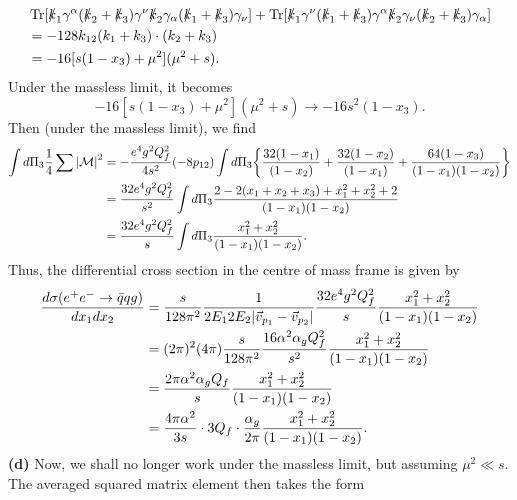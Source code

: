\documentclass[11pt]{article}
\theoremstyle{definition}
\begin{document}
\begin{equation}
    \begin{aligned}
        &\Tr[\slashed{k}_1\gamma^\alpha(\slashed{k}_2 + \slashed{k}_3)\gamma^\nu\slashed{k}_2\gamma_\alpha(\slashed{k}_1 + \slashed{k}_3)\gamma_\nu]+ \Tr[\slashed{k}_1\gamma^\nu(\slashed{k}_1 + \slashed{k}_3)\gamma^\alpha\slashed{k}_2\gamma_\nu(\slashed{k}_2 + \slashed{k}_3)\gamma_\alpha] \\
        &= -128k_{12}(k_1+k_3)\cdot(k_2+k_3)\\
        &= -16[s(1-x_3)+\mu^2](\mu^2+s).
    \end{aligned}
\end{equation}
Under the massless limit, it becomes
\begin{equation}
    -16[s(1-x_3)+\mu^2](\mu^2+s) \to -16s^2(1-x_3).
\end{equation}
Then (under the massless limit), we find
\begin{equation}
    \begin{aligned}
        \int d\Pi_3 \frac{1}{4}\sum \abs{\mathcal{M}}^2 
        &= -\frac{e^4g^2Q_f^2}{4s^2}(-8p_{12})\int d\Pi_3\bigg\{\frac{32(1-x_1)}{(1-x_2)} + \frac{32(1-x_2)}{(1-x_1)} + \frac{64(1-x_3)}{(1-x_1)(1-x_2)}\bigg\}\\
        &=\frac{32e^4g^2Q_f^2}{s^2}\int d\Pi_3\frac{2-2(x_1+x_2+x_3)+x_1^2+x_2^2+2}{(1-x_1)(1-x_2)}\\
        &=\frac{32e^4g^2Q_f^2}{s}\int d\Pi_3\frac{x_1^2 + x_2^2}{(1-x_1)(1-x_2)}.
    \end{aligned}
\end{equation}
Thus, the differential cross section in the centre of mass frame is given by
\begin{equation}
    \begin{aligned}
        \frac{d\sigma(e^+e^-\to\bar{q}qg)}{dx_1dx_2} &= \frac{s}{128\pi^2}\frac{1}{2E_12E_2\abs{\vec{v}_{p_1}-\vec{v}_{p_2}}}\frac{32e^4g^2Q_f^2}{s}\frac{x_1^2 + x_2^2}{(1-x_1)(1-x_2)}\\
        &= (2\pi)^2(4\pi)\frac{s}{128\pi^2}\frac{16\alpha^2\alpha_gQ_f^2}{s^2}\frac{x_1^2 + x_2^2}{(1-x_1)(1-x_2)}\\
        &= \frac{2\pi\alpha^2\alpha_gQ_f}{s}\frac{x_1^2 + x_2^2}{(1-x_1)(1-x_2)}\\
        &= \frac{4\pi\alpha^2}{3s}\cdot 3Q_f \cdot \frac{\alpha_g}{2\pi}\frac{x_1^2 + x_2^2}{(1-x_1)(1-x_2)}.
    \end{aligned}
\end{equation}
\textbf{(d)} Now, we shall no longer work under the massless limit, but assuming $\mu^2 \ll s$. The averaged squared matrix element then takes the form
\end{document}
